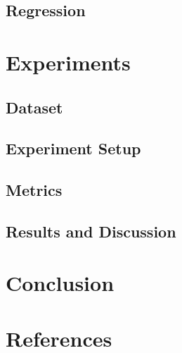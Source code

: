 \documentclass{article}
\begin{document}
\subsection{Regression}

\section{Experiments}

\subsection{Dataset}

\subsection{Experiment Setup}

\subsection{Metrics}

\subsection{Results and Discussion}


\section{Conclusion}


\section{References}



\end{document}
